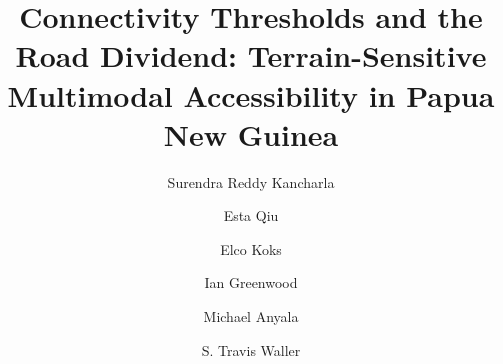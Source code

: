 \documentclass[review,3p,authoryear]{elsarticle}
\begin{document}
\begin{frontmatter}

\title{Connectivity Thresholds and the Road Dividend: Terrain-Sensitive Multimodal Accessibility in Papua New Guinea}

\author[tud]{Surendra Reddy Kancharla}


\author[tud]{Esta Qiu}
\author[vu]{Elco Koks}
\author {Ian Greenwood}
\author[adb]{Michael Anyala}

\author[tud]{S. Travis Waller}

\address[tud]{``Friedrich List'' Faculty of Transport and Traffic Sciences, Technische Universit\"at Dresden, Dresden, Germany}
\address[vu]{Faculty of Science, Water and Climate Risk, Vrije Universiteit Amsterdam, Amsterdam, Netherlands}
\address[adb]{Senior Road Asset Management Specialist, Asian Development Bank}


\end{frontmatter}
\end{document}

